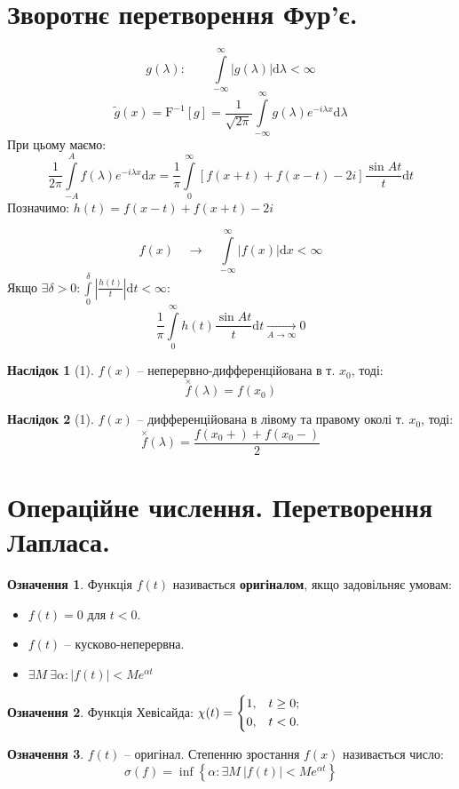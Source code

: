 \documentclass[a4paper]{scrartcl}
\theoremstyle{definition}
\newtheorem*{defo}{Означення}
\theoremstyle{remark}
\theoremstyle{definition}
\newtheorem*{consequence}{Наслідок}
\theoremstyle{definition}
\def\i{\infty}                 %
\begin{document}
\section{Зворотнє перетворення Фур'є.}
\[
 g(\lambda) : \qquad  \int\limits_{-\i}^{\i}{ \left| g(\lambda) \right|\mathrm{d} \lambda} < \i
\]
\[
 \tilde{g} (x) = \mathrm{F}^{-1}[g] = \frac{1}{\sqrt{2\pi}}   \int\limits_{-\i}^{\i}{
 g(\lambda) e^{-i \lambda x} \mathrm{d} \lambda
 }
\]
При цьому маємо:
\[
  \frac{1}{2\pi}  \int\limits_{-A}^{A}{
  \widehat{f} (\lambda) e^{- i \lambda x} \mathrm{d} x
  }  = \frac{1}{\pi}  \int\limits_{0}^{\i}{
  \left[  f(x + t) + f (x - t) - 2 i \right] \frac{\sin At}{t} \mathrm{d} t
  }
\]
Позначимо: \( h (t) =  f(x-t) + f(x + t) - 2i \)
\begin{boxteo}
\[
  f(x) \quad \longrightarrow \quad  \int\limits_{-\i}^{\i}{ |f(x)|\mathrm{d}x} < \i
\]
Якщо \(  \displaystyle \exists \delta >0 :  \int\limits_{0}^{\delta}{
\left| \frac{h(t)}{t} \right| \mathrm{d} t
} < \i: \)
\[
 \frac{1}{\pi}  \int\limits_{0}^{\i}{ h(t) \frac{\sin{At}}{t}} \mathrm{d} t \xrightarrow[A \to \i]{} 0
\]
\end{boxteo}
\begin{consequence}[1]
\( f(x) \) -- неперервно-дифференційована в т. \( x_0  \), тоді:
\[
\overset{\times}{f}(\lambda) = f(x_0)
\]
\end{consequence}
\begin{consequence}[1]
\( f(x) \) -- дифференційована в лівому та правому околі т. \( x_0  \), тоді:
\[
\overset{\times}{f}(\lambda) = \frac{f(x_0+) + f(x_0-)}{2}
\]
\end{consequence}
\newpage
\section{Операційне числення. Перетворення Лапласа.}
\begin{defo} Функція \( f(t) \) називається \textbf{оригіналом}, якщо задовільняє умовам:
\begin{itemize}
  \item \( f(t) = 0  \) для \( t < 0 \).
  \item \( f(t) \) -- кусково-неперервна.
  \item \( \exists M \ \exists \alpha : \left| f(t) \right| < M e^{\alpha t} \)
\end{itemize}
\end{defo}
\begin{defo}
 Функція Хевісайда: \( \displaystyle \chi (t) = \begin{dcases}
  1 , & t\geq 0 ;\\
  0 , & t < 0.
 \end{dcases} \)
\end{defo}
\begin{defo}
  \( f(t) \) -- оригінал. Степенню зростання \( f(x) \) називається число:
  \[
   \sigma(f) =  \inf\limits_{}{ \left\lbrace \alpha : \exists M \ \left| f(t) \right| < M e^{\alpha t} \right\rbrace} 
  \]

\end{defo}
\end{document}
